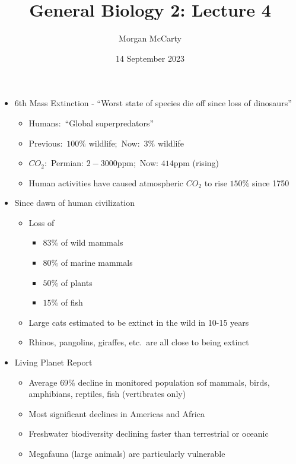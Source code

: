 \documentclass[12pt]{article}
\title{
    General Biology 2: Lecture 4}
\author{Morgan McCarty}
\date{14 September 2023}
\begin{document}
    \maketitle

    \begin{itemize}
        \item 6th Mass Extinction - ``Worst state of species die off since loss of dinosaurs''
        \begin{itemize}
            \item Humans:\ ``Global superpredators''
            \item Previous:\ $100\%$ wildlife;\ Now:\ $3\%$ wildlife
            \item $CO_2$:\ Permian: $2-3000$ppm;\ Now: $414$ppm (rising)
            \item Human activities have caused atmospheric $CO_2$ to rise $150\%$ since 1750
        \end{itemize}
        \item Since dawn of human civilization
        \begin{itemize}
            \item Loss of
            \begin{itemize}
                \item $83\%$ of wild mammals
                \item $80\%$ of marine mammals
                \item $50\%$ of plants
                \item $15\%$ of fish
            \end{itemize}
            \item Large cats estimated to be extinct in the wild in 10-15 years
            \item Rhinos, pangolins, giraffes, etc.\ are all close to being extinct
        \end{itemize}
        \item Living Planet Report
        \begin{itemize}
            \item Average $69\%$ decline in monitored population sof mammals, birds, amphibians, reptiles, fish (vertibrates only)
            \item Most significant declines in Americas and Africa
            \item Freshwater biodiversity declining faster than terrestrial or oceanic
            \item Megafauna (large animals) are particularly vulnerable

\end{itemize}
\end{itemize}
\end{document}
